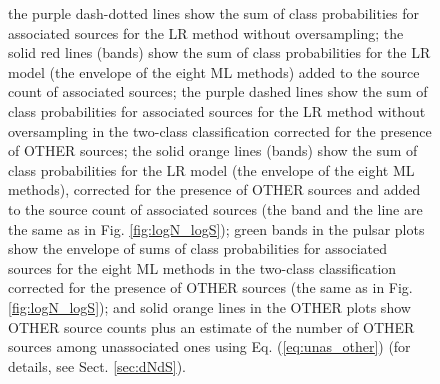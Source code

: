\documentclass[referee]{aa} %
\begin{document}
\begin{figure}[h]
{the purple dash-dotted lines show the sum of class probabilities for associated sources for the LR method without oversampling; the solid red lines (bands) show the sum of class probabilities for the LR model (the envelope of the eight ML methods) added to the source count of associated sources; the purple dashed lines show the sum of class probabilities for associated sources for the LR method without oversampling in the two-class classification corrected for the presence of OTHER sources; the solid orange lines (bands) show the sum of class probabilities for the LR model (the envelope of the eight ML methods), corrected for the presence of OTHER sources and added to the source count of associated sources (the band and the line are the same as in Fig. \ref{fig:logN_logS}); green bands in the pulsar plots show the envelope of sums of class probabilities for associated sources for the eight ML methods in the two-class classification corrected for the presence of OTHER sources (the same as in Fig. \ref{fig:logN_logS}); and solid orange lines in the OTHER plots show OTHER source counts plus an estimate of the number of OTHER sources among unassociated ones using Eq. (\ref{eq:unas_other}) (for details, see Sect. \ref{sec:dNdS}).
}  
\label{fig:logN_logS_3classes}
\end{figure}
\end{document}
